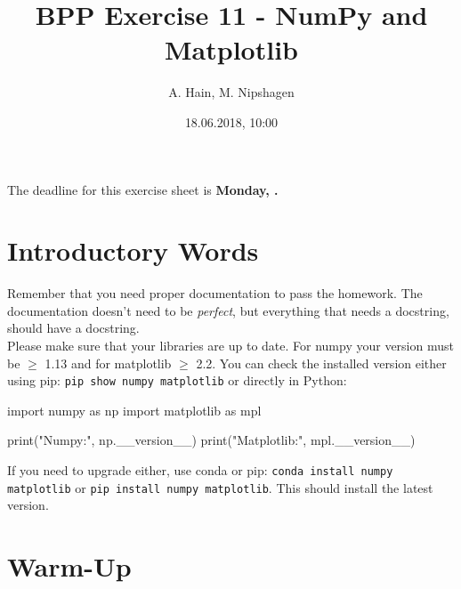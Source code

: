 
\usepackage{setspace}

\title{BPP Exercise 11 - NumPy and Matplotlib}
\author{A. Hain, M. Nipshagen}
\date{18.06.2018, 10:00}


\makeatletter
\let\thetitle\@title
\let\theauthor\@author
\let\thedate\@date
\makeatother


\newcommand\itemsub[1]{
	\begin{itemize}
		\item #1
	\end{itemize}
}

\renewcommand\sol[1]{}




The deadline for this exercise sheet is \textbf{Monday, \thedate.}

\section*{Introductory Words}
Remember that you need proper documentation to pass
the homework. The documentation doesn't need to be \textit{perfect}, but
everything that needs a docstring, should have a docstring.\\

\noindent Please make sure that your libraries are up to date. For numpy your
version must be $\geq$ 1.13 and for matplotlib $\geq$ 2.2. You can check the
installed version either using pip: \verb|pip show numpy matplotlib| or
directly in Python:
\begin{python}
import numpy as np
import matplotlib as mpl

print("Numpy:", np.__version__)
print("Matplotlib:", mpl.__version__)
\end{python}
If you need to upgrade either, use conda or pip: 
\verb|conda install numpy matplotlib| or \verb|pip install numpy matplotlib|.
This should install the latest version.

\section{Warm-Up}
